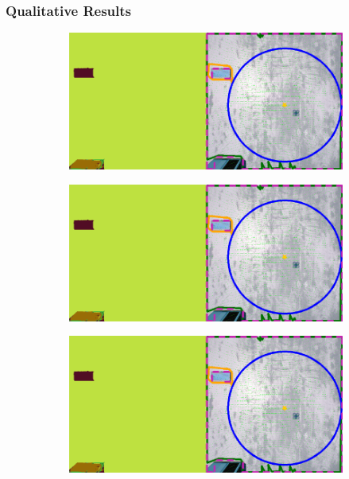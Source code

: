 \subsubsection{Qualitative Results}

\begin{figure}[!t]
 \centering
  \begin{subfigure}{.32\linewidth}
    \centering\includegraphics[page=1, width=.99\linewidth]{chapter_6_landingsim/figs/QualitativeExamples.pdf}
    \caption{\label{fig:ch6_qualitative_a}}
  \end{subfigure}
  \begin{subfigure}{.32\linewidth}
    \centering\includegraphics[page=3, width=.99\linewidth]{chapter_6_landingsim/figs/QualitativeExamples.pdf}
    \caption{\label{fig:ch6_qualitative_c}}
  \end{subfigure}
  \begin{subfigure}{.32\linewidth}
    \centering\includegraphics[page=4, width=.99\linewidth]{chapter_6_landingsim/figs/QualitativeExamples.pdf}

\end{subfigure}
\end{figure}

